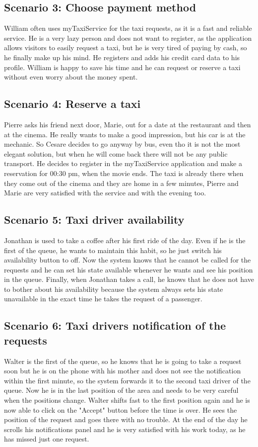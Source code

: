 \documentclass[18pt,oneside,a4paper, titlepage]{article}
\begin{document}
	\subsection{Scenario 3: Choose payment method}
		William often uses myTaxiService for the taxi requests, as it is a fast and reliable service. He is a very lazy person and does not want to register, as the application allows visitors to easily request a taxi, but he is very tired of paying by cash, so he finally make up his mind. He registers and adds his credit card data to his profile. William is happy to save his time and he can request or reserve a taxi without even worry about the money spent.
	
	\subsection{Scenario 4: Reserve a taxi}
		Pierre asks his friend next door, Marie, out for a date at the restaurant and then at the cinema. He really wants to make a good impression, but his car is at the mechanic. So Cesare decides to go anyway by bus, even tho it is not the most elegant solution, but when he will come back there will not be any public transport. He decides to register in the myTaxiService application and make a reservation for 00:30 pm, when the movie ends. The taxi is already there when they come out of the cinema and they are home in a few minutes, Pierre and Marie are very satisfied with the service and with the evening too.
		\newpage
	\subsection{Scenario 5: Taxi driver availability}
		Jonathan is used to take a coffee after his first ride of the day. Even if he is the first of the queue, he wants to maintain this habit, so he just switch his availability button to off. Now the system knows that he cannot be called for the requests and he can set his state available whenever he wants and see his position in the queue. Finally, when Jonathan takes a call, he knows that he does not have to bother about his availability because the system always sets his state unavailable in the exact time he takes the request of a passenger.
		
	\subsection{Scenario 6: Taxi drivers notification of the requests}
		Walter is the first of the queue, so he knows that he is going to take a request soon but he is on the phone with his mother and does not see the notification within the first minute, so the system forwards it to the second taxi driver of the queue. Now he is in the last position of the area and needs to be very careful when the positions change. Walter shifts fast to the first position again and he is now able to click on the "Accept" button before the time is over. He sees the position of the request and goes there with no trouble. At the end of the day he scrolls his notifications panel and he is very satisfied with his work today, as he has missed just one request.
\newpage
\end{document}
